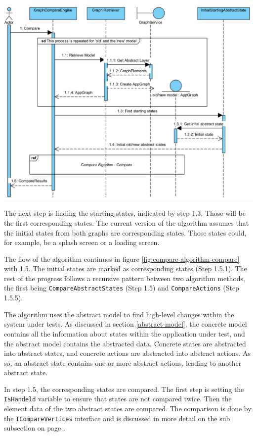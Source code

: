 \begingroup
\captionsetup{type=figure}
\includegraphics[scale=0.9]{content/5-Results/Images/Compare-algorithm-start.png}
\label{fig:compare-algorithm-start}
\endgroup

The next step is finding the starting states, indicated by step 1.3. Those will be the first corresponding states. The current version of the algorithm assumes that the initial states from both graphs are corresponding states. Those states could, for example, be a splash screen or a loading screen.

The flow of the algorithm continues in figure \ref{fig:compare-algorithm-compare} with 1.5. The initial states are marked as corresponding states (Step 1.5.1). The rest of the progress follows a recursive pattern between two algorithm methods, the first being \verb|CompareAbstractStates| (Step 1.5) and \verb|CompareActions| (Step 1.5.5).

The algorithm uses the abstract model to find high-level changes within the system under tests. As discussed in section \ref{abstract-model}, the concrete model contains all the information about states within the application under test, and the abstract model contains the abstracted data. Concrete states are abstracted into abstract states, and concrete actions are abstracted into abstract actions. As so, an abstract state contains one or more abstract actions, leading to another abstract state.
 
In step 1.5, the corresponding states are compared. The first step is setting the \verb|IsHandeld| variable to ensure that states are not compared twice. Then the element data of the two abstract states are compared. The comparison is done by the \verb|ICompareVertices| interface and is discussed in more detail on the sub subsection on page \pageref{sec:i-compare-vertices}.

